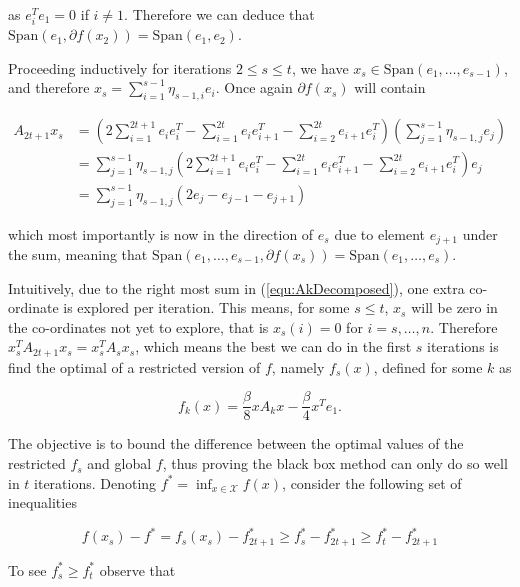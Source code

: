 as $e_i^Te_1 = 0$ if $i \not = 1$. Therefore we can deduce that $\text{Span}(e_1,\partial f(x_2)) = \text{Span}(e_1,e_2)$.  

Proceeding inductively for iterations $2 \leq s \leq t$, we have $x_{s} \in \text{Span}(e_1,\dots,e_{s-1})$, and therefore $x_{s} = \sum_{i=1}^{s-1} \eta_{s-1,i} e_i$. Once again $\partial f(x_{s})$ will contain 

\begin{align*}
A_{2t+1}x_{s} & =  \left( 
2 \sum_{i=1}^{2t+1} e_i e_i^T - \sum_{i=1}^{2t} e_{i}e_{i+1}^T - \sum_{i=2}^{2t}e_{i+1} e_i^T
\right)
\left( \sum_{j=1}^{s-1} \eta_{s-1,j} e_j \right)\\
&= 
\sum_{j=1}^{s-1} \eta_{s-1,j} \left( 
2 \sum_{i=1}^{2t+1} e_i e_i^T - \sum_{i=1}^{2t} e_{i}e_{i+1}^T - \sum_{i=2}^{2t}e_{i+1} e_i^T
\right) e_j\\
&= 
\sum_{j=1}^{s-1} \eta_{s-1,j} \left( 
2 e_j - e_{j-1} - e_{j+1} 
\right)
\end{align*}

which most importantly is now in the direction of $e_s$ due to element $e_{j+1}$ under the sum, meaning that $\text{Span}(e_1,\dots,e_{s-1},\partial f(x_{s})) = \text{Span}(e_1,\dots,e_s)$.  

Intuitively, due to the right most sum in (\ref{equ:AkDecomposed}), one extra co-ordinate is explored per iteration.  This means, for some $s \leq t$, $x_s$ will be zero in the co-ordinates not yet to explore, that is $x_s(i) = 0$ for $i = s,\dots,n$. Therefore $x_s^T A_{2t+1}x_s = x_s^T A_s x_s$, which means the best we can do in the first $s$ iterations is find the optimal of a restricted version of $f$, namely $f_s(x)$, defined for some $k$ as 

\begin{equation}
f_k(x) = \frac{\beta}{8}xA_k x - \frac{\beta}{4} x^T e_1.
\end{equation}

The objective is to bound the difference between the optimal values of the restricted $f_s$ and global $f$, thus proving the black box method can only do so well in $t$ iterations.  Denoting $f^* = \inf_{x \in \mathcal{X}} f(x)$,  consider the following set of inequalities

\begin{equation}
f(x_s)- f^* = f_s(x_s) - f_{2t+1}^* \geq f_s^* - f_{2t + 1}^* \geq f_t^* - f_{2t + 1}^*
\label{equ:OptimDiff}
\end{equation}

To see $f_s^* \geq f_t^*$ observe that 

